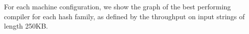 \documentclass[acmsmall, nonacm]{acmart}
\begin{document}
For each machine configuration, we show the graph of the best performing compiler for each hash family, as defined by the throughput on input strings of length 250KB.







\end{document}

